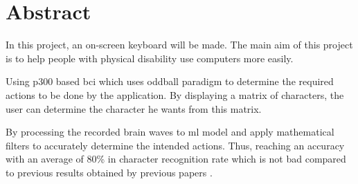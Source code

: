 \chapter*{Abstract}
\label{chap:abstract}
In this project, an on-screen keyboard will be made. The main aim of this project is to help people with physical disability use computers more easily.\par
Using \ac{p300} based \ac{bci} which uses oddball paradigm to determine the required actions to be done by the application. By displaying a matrix of characters, the user can determine the character he wants from this matrix.\par
By processing the recorded brain waves to \ac{ml} model and apply mathematical filters to accurately determine the intended actions. Thus, reaching an accuracy with an average of 80\% in character recognition rate which is not bad compared to previous results obtained by previous papers \cite{inproceedings1, inproceedings2, article1, article2}.\par
\clearpage
